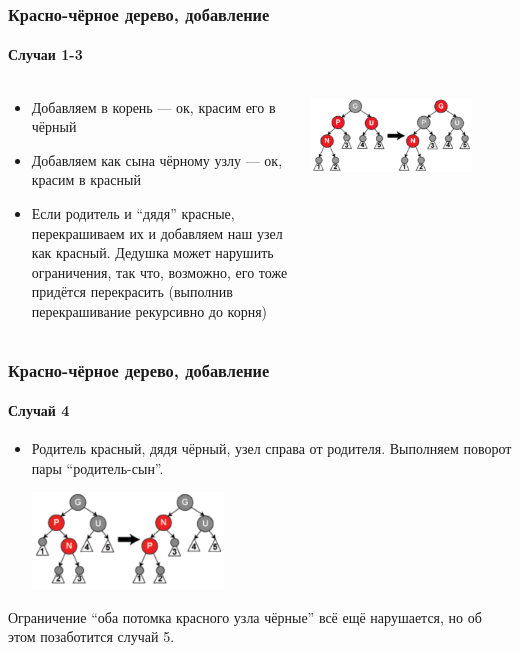 \documentclass[xetex,mathserif,serif]{beamer}
\begin{document}
	\begin{frame}
		\frametitle{Красно-чёрное дерево, добавление}
		\framesubtitle{Случаи 1-3}
		\begin{columns}
			\begin{column}{0.5\textwidth}
				\begin{itemize}
					\item Добавляем в корень --- ок, красим его в чёрный
					\item Добавляем как сына чёрному узлу --- ок, красим в красный
					\item Если родитель и ``дядя'' красные, перекрашиваем их и добавляем наш узел как красный. Дедушка может нарушить ограничения, так что, возможно, его тоже придётся перекрасить (выполнив перекрашивание рекурсивно до корня)
				\end{itemize}
			\end{column}
			\begin{column}{0.5\textwidth}
				\includegraphics[width=0.8\textwidth]{redBlackAdding1.png}
			\end{column}
		\end{columns}
	\end{frame}

	\begin{frame}
		\frametitle{Красно-чёрное дерево, добавление}
		\framesubtitle{Случай 4}
		\begin{itemize}
			\item Родитель красный, дядя чёрный, узел справа от родителя. Выполняем поворот пары ``родитель-сын''.
			\begin{center}
				\includegraphics[width=0.4\textwidth]{redBlackAdding2.png}
			\end{center}
		\end{itemize}
		Ограничение ``оба потомка красного узла чёрные'' всё ещё нарушается, но об этом позаботится случай 5.
	\end{frame}
\end{document}
